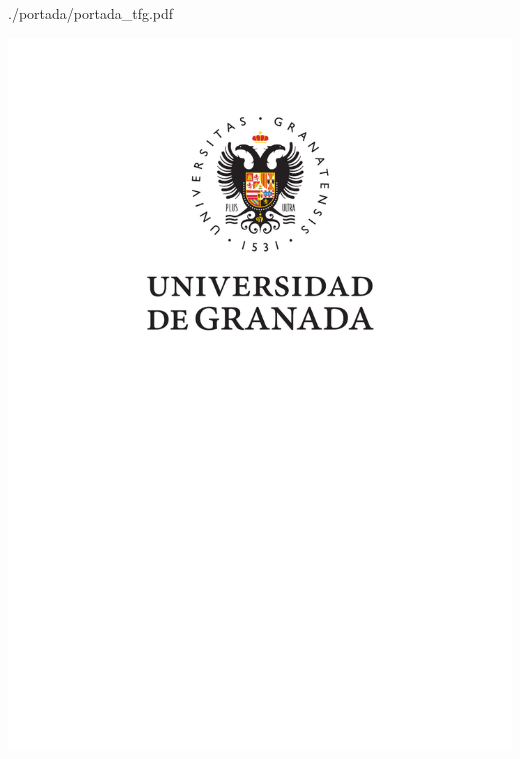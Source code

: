 
\newlength{\originalVOffset}
\newlength{\originalHOffset}
\setlength{\originalVOffset}{\voffset}
\setlength{\originalHOffset}{\hoffset}

\setlength{\voffset}{0cm}
\setlength{\hoffset}{0cm}


{./portada/portada_tfg.pdf}

\setlength{\voffset}{\originalVOffset}
\setlength{\hoffset}{\originalHOffset}


 \setcounter{page}{1}
\thispagestyle{empty}
\vspace*{3cm}
\newpage


\begin{center}
\textbf{\huge \includegraphics[scale=1.45]{figuras/logo_ugr.pdf}}
\par\end{center}{\huge \par}

